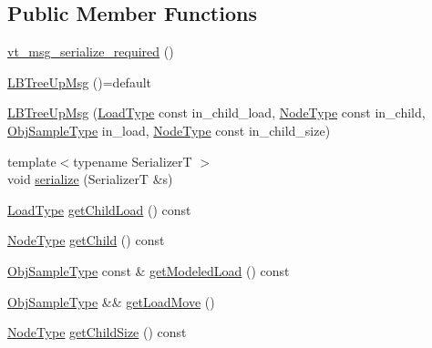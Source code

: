 \subsection*{Public Member Functions}
\begin{DoxyCompactItemize}
\item 
\hyperlink{structvt_1_1vrt_1_1collection_1_1lb_1_1_l_b_tree_up_msg_af56129ab0f46796fb31785e0a573cb5d}{vt\+\_\+msg\+\_\+serialize\+\_\+required} ()
\item 
\hyperlink{structvt_1_1vrt_1_1collection_1_1lb_1_1_l_b_tree_up_msg_a3dd039d297e1ea09939a13ad5a3722a3}{L\+B\+Tree\+Up\+Msg} ()=default
\item 
\hyperlink{structvt_1_1vrt_1_1collection_1_1lb_1_1_l_b_tree_up_msg_ac2ff0f6b4a047ab11a0cd372c54a141e}{L\+B\+Tree\+Up\+Msg} (\hyperlink{namespacevt_a8fb51741340b87d7aaee0bef60e9896b}{Load\+Type} const in\+\_\+child\+\_\+load, \hyperlink{namespacevt_a866da9d0efc19c0a1ce79e9e492f47e2}{Node\+Type} const in\+\_\+child, \hyperlink{structvt_1_1vrt_1_1collection_1_1lb_1_1_hier_l_b_types_a597a60d517207b90e8c7984eac434e8f}{Obj\+Sample\+Type} in\+\_\+load, \hyperlink{namespacevt_a866da9d0efc19c0a1ce79e9e492f47e2}{Node\+Type} const in\+\_\+child\+\_\+size)
\item 
{\footnotesize template$<$typename SerializerT $>$ }\\void \hyperlink{structvt_1_1vrt_1_1collection_1_1lb_1_1_l_b_tree_up_msg_a6d948678b6361cbaa753d878b72fbce8}{serialize} (SerializerT \&s)
\item 
\hyperlink{namespacevt_a8fb51741340b87d7aaee0bef60e9896b}{Load\+Type} \hyperlink{structvt_1_1vrt_1_1collection_1_1lb_1_1_l_b_tree_up_msg_a24c0c47c9e76945c75b7827ccdb8b446}{get\+Child\+Load} () const
\item 
\hyperlink{namespacevt_a866da9d0efc19c0a1ce79e9e492f47e2}{Node\+Type} \hyperlink{structvt_1_1vrt_1_1collection_1_1lb_1_1_l_b_tree_up_msg_a430d99ecbeb875f33ecd1b4c33c6ea5f}{get\+Child} () const
\item 
\hyperlink{structvt_1_1vrt_1_1collection_1_1lb_1_1_hier_l_b_types_a597a60d517207b90e8c7984eac434e8f}{Obj\+Sample\+Type} const  \& \hyperlink{structvt_1_1vrt_1_1collection_1_1lb_1_1_l_b_tree_up_msg_a2ab64313485fc6b4b091c1a7a0b94aa1}{get\+Modeled\+Load} () const
\item 
\hyperlink{structvt_1_1vrt_1_1collection_1_1lb_1_1_hier_l_b_types_a597a60d517207b90e8c7984eac434e8f}{Obj\+Sample\+Type} \&\& \hyperlink{structvt_1_1vrt_1_1collection_1_1lb_1_1_l_b_tree_up_msg_aa5c9744fbb8557e3ec37846d9c8e09e7}{get\+Load\+Move} ()
\item 
\hyperlink{namespacevt_a866da9d0efc19c0a1ce79e9e492f47e2}{Node\+Type} \hyperlink{structvt_1_1vrt_1_1collection_1_1lb_1_1_l_b_tree_up_msg_a6d1dee8d6c40a169c16d1bbddb371478}{get\+Child\+Size} () const
\end{DoxyCompactItemize}
